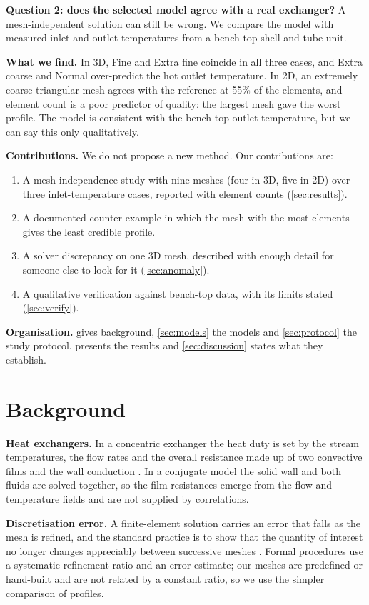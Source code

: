 \documentclass[11pt,letterpaper]{article}
\begin{document}
\textbf{Question 2: does the selected model agree with a real exchanger?} A mesh-independent solution can still be wrong. We compare the model with measured inlet and outlet temperatures from a bench-top shell-and-tube unit.

\textbf{What we find.} In 3D, Fine and Extra fine coincide in all three cases, and Extra coarse and Normal over-predict the hot outlet temperature. In 2D, an extremely coarse triangular mesh agrees with the reference at 55\% of the elements, and element count is a poor predictor of quality: the largest mesh gave the worst profile. The model is consistent with the bench-top outlet temperature, but we can say this only qualitatively.

\textbf{Contributions.} We do not propose a new method. Our contributions are:
\begin{enumerate}
\item A mesh-independence study with nine meshes (four in 3D, five in 2D) over three inlet-temperature cases, reported with element counts (\cref{sec:results}).
\item A documented counter-example in which the mesh with the most elements gives the least credible profile.
\item A solver discrepancy on one 3D mesh, described with enough detail for someone else to look for it (\cref{sec:anomaly}).
\item A qualitative verification against bench-top data, with its limits stated (\cref{sec:verify}).
\end{enumerate}

\textbf{Organisation.}  gives background, \cref{sec:models} the models and \cref{sec:protocol} the study protocol.  presents the results and \cref{sec:discussion} states what they establish.

\section{Background}\label{sec:background}
\textbf{Heat exchangers.} In a concentric exchanger the heat duty is set by the stream temperatures, the flow rates and the overall resistance made up of two convective films and the wall conduction \citep{incropera2007,shah2003,kays1984}. In a conjugate model the solid wall and both fluids are solved together, so the film resistances emerge from the flow and temperature fields and are not supplied by correlations.

\textbf{Discretisation error.} A finite-element solution carries an error that falls as the mesh is refined, and the standard practice is to show that the quantity of interest no longer changes appreciably between successive meshes \citep{roache1998,celik2008}. Formal procedures use a systematic refinement ratio and an error estimate; our meshes are predefined or hand-built and are not related by a constant ratio, so we use the simpler comparison of profiles.
\end{document}
